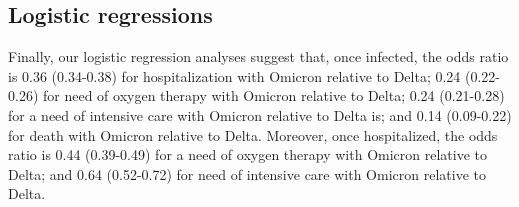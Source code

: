\documentclass[preprint,12pt,authoryear]{elsarticle}
\begin{document}
\subsection*{Logistic regressions}

Finally, our logistic regression analyses suggest that, once infected, the odds ratio  is 0.36 (0.34-0.38) for hospitalization with Omicron relative to Delta;  0.24 (0.22-0.26) for need of oxygen therapy with Omicron relative to Delta;  0.24 (0.21-0.28) for a need of intensive care with Omicron relative to Delta is; and  0.14 (0.09-0.22) for death with Omicron relative to Delta. Moreover, once hospitalized, the odds ratio  is 0.44 (0.39-0.49) for a need of oxygen therapy with Omicron relative to Delta;  and  0.64 (0.52-0.72) for need of intensive care with Omicron relative to Delta.

 
 
\end{document}
